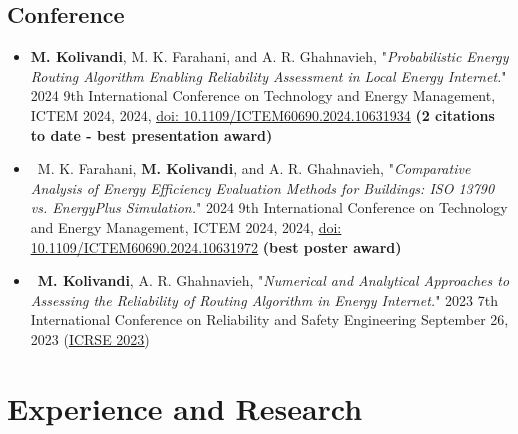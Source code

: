 \documentclass[letter,20pt]{article}
\begin{document}
\subsection*{\fontsize{10pt}{12pt}\selectfont Conference}
    \begin{itemize}[noitemsep, topsep=3pt, leftmargin=3ex]
    
    \small\item\justifying \textbf{M. Kolivandi}, M. K. Farahani, and A. R. Ghahnavieh, "\textit{Probabilistic Energy Routing Algorithm Enabling Reliability Assessment in Local Energy Internet.}"  2024 9th International Conference on Technology and Energy Management, ICTEM 2024, 2024, \href{http://dx.doi.org/10.1109/ICTEM60690.2024.10631934}{\underline{doi: 10.1109/ICTEM60690.2024.10631934}} \textbf{(2 citations to date - best presentation award)}\vspace{5pt}
    
    \small\item\ M. K. Farahani, \textbf{M. Kolivandi}, and A. R. Ghahnavieh, "\textit{Comparative Analysis of Energy Efficiency Evaluation Methods for Buildings: ISO 13790 vs. EnergyPlus Simulation.}"  2024 9th International Conference on Technology and Energy Management, ICTEM 2024, 2024, \href{http://dx.doi.org/10.1109/ICTEM60690.2024.10631972}{\underline{doi: 10.1109/ICTEM60690.2024.10631972}} \textbf{(best poster award)}\vspace{5pt}
    
    \small\item\ \textbf{M. Kolivandi}, A. R. Ghahnavieh, "\textit{Numerical and Analytical Approaches to Assessing the Reliability of Routing Algorithm in Energy Internet.}" 2023 7th International Conference on Reliability and Safety Engineering September 26, 2023 (\href{https://www.icrse2023.ir/files_site/files/paper/icrse7-01450120.pdf}{\underline{ICRSE 2023}}\vspace{5pt})\vspace{5pt}
\end{itemize}





\section{\textbf{Experience and Research}}
\vspace{5pt}
\end{document}
